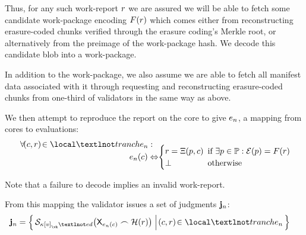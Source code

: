 Thus, for any such work-report $r$ we are assured we will be able to fetch some candidate work-package encoding $F(r)$ which comes either from reconstructing erasure-coded chunks verified through the erasure coding's Merkle root, or alternatively from the preimage of the work-package hash. We decode this candidate blob into a work-package.

In addition to the work-package, we also assume we are able to fetch all manifest data associated with it through requesting and reconstructing erasure-coded chunks from one-third of validators in the same way as above.

We then attempt to reproduce the report on the core to give $e_{n}$, a mapping from cores to evaluations: \vskip -7pt
\begin{equation}
  \begin{aligned}
    \forall \tup{\cX, \wrX} \in \local¬tranche\sub{n} :\ \ &\\[-10pt]
    e\sub{n}(\cX) \Leftrightarrow &\begin{cases}
      \wrX = \computereport(p, \cX)\!\!\! &\when \exists p \in \workpackage: \encode{p} = F(\wrX) \\
      \bot &\otherwise
    \end{cases}
  \end{aligned}\!\!
\end{equation}

Note that a failure to decode implies an invalid work-report.

From this mapping the validator issues a set of judgments $\mathbf{j}_{n}$:
\begin{align}
  \mathbf{j}\sub{n} &= \set{\build{\signdata{\activeset\subb{v}_\vk¬ed}{\mathsf{X}_{e\sub{n}(\cX)} \concat \blake{\wrX}}}{\tup{\cX, \wrX} \in \local¬tranche\sub{n}}}
\end{align}


